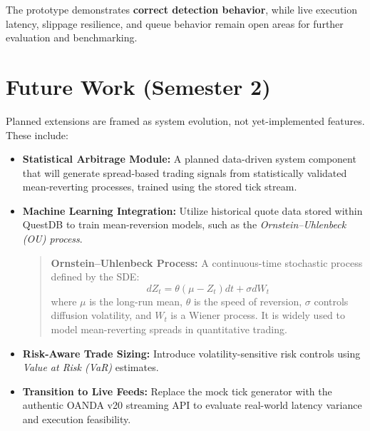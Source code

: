 \documentclass[letterpaper,11pt]{report}
\begin{document}
The prototype demonstrates \textbf{correct detection behavior}, while live execution latency, slippage resilience, and queue behavior remain open areas for further evaluation and benchmarking.


\section{Future Work (Semester 2)}

Planned extensions are framed as system evolution, not yet-implemented features. These include:

\begin{itemize}

    \item \textbf{Statistical Arbitrage Module:}  
    A planned data-driven system component that will generate spread-based trading signals from statistically validated mean-reverting processes, trained using the stored tick stream.

    \item \textbf{Machine Learning Integration:}  
    Utilize historical quote data stored within QuestDB to train mean-reversion models, such as the \emph{Ornstein–Uhlenbeck (OU) process}.

    \begin{quote}
        \textbf{ Ornstein–Uhlenbeck Process:}  
        A continuous-time stochastic process defined by the SDE:
        \[
            dZ_t = \theta(\mu - Z_t) dt + \sigma dW_t
        \]
        where $\mu$ is the long-run mean, $\theta$ is the speed of reversion, $\sigma$ controls diffusion volatility, and $W_t$ is a Wiener process. It is widely used to model mean-reverting spreads in quantitative trading.
    \end{quote}

    \item \textbf{Risk-Aware Trade Sizing:}  
    Introduce volatility-sensitive risk controls using \emph{Value at Risk (VaR)} estimates.

    \item \textbf{Transition to Live Feeds:}  
    Replace the mock tick generator with the authentic OANDA v20 streaming API to evaluate real-world latency variance and execution feasibility.

\end{itemize}
\end{document}
